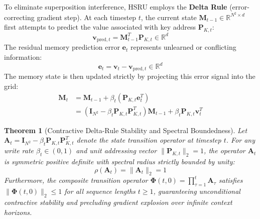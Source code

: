 \documentclass[11pt,a4paper]{article}
\newtheorem{theorem}{Theorem}[section]
\begin{document}
To eliminate superposition interference, HSRU employs the \textbf{Delta Rule} (error-correcting gradient step). At each timestep $t$, the current state $\mathbf{M}_{t-1} \in \mathbb{R}^{N^2 \times d}$ first attempts to predict the value associated with key address $\mathbf{P}_{K,t}$:
\begin{equation}
    \mathbf{v}_{\text{pred}, t} = \mathbf{M}_{t-1}^T \mathbf{P}_{K,t} \in \mathbb{R}^d
\end{equation}
The residual memory prediction error $\mathbf{e}_t$ represents unlearned or conflicting information:
\begin{equation}
    \mathbf{e}_t = \mathbf{v}_t - \mathbf{v}_{\text{pred}, t} \in \mathbb{R}^d
\end{equation}
The memory state is then updated strictly by projecting this error signal into the grid:
\begin{align}
    \mathbf{M}_t &= \mathbf{M}_{t-1} + \beta_t (\mathbf{P}_{K,t} \mathbf{e}_t^T) \\
    &= (\mathbf{I}_{N^2} - \beta_t \mathbf{P}_{K,t} \mathbf{P}_{K,t}^T) \mathbf{M}_{t-1} + \beta_t \mathbf{P}_{K,t} \mathbf{v}_t^T
\end{align}

\begin{theorem}[Contractive Delta-Rule Stability and Spectral Boundedness]
\label{thm:delta_stability}
Let $\mathbf{A}_t = \mathbf{I}_{N^2} - \beta_t \mathbf{P}_{K,t} \mathbf{P}_{K,t}^T$ denote the state transition operator at timestep $t$. For any write rate $\beta_t \in (0, 1)$ and unit addressing vector $\|\mathbf{P}_{K,t}\|_2 = 1$, the operator $\mathbf{A}_t$ is symmetric positive definite with spectral radius strictly bounded by unity:
\begin{equation}
    \rho(\mathbf{A}_t) = \|\mathbf{A}_t\|_2 = 1
\end{equation}
Furthermore, the composite transition operator $\mathbf{\Phi}(t, 0) = \prod_{\tau=1}^t \mathbf{A}_\tau$ satisfies $\|\mathbf{\Phi}(t, 0)\|_2 \le 1$ for all sequence lengths $t \ge 1$, guaranteeing unconditional contractive stability and precluding gradient explosion over infinite context horizons.
\end{theorem}
\end{document}
